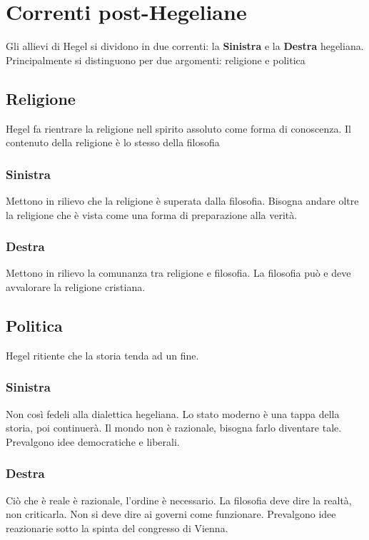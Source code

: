 
\section{Correnti post-Hegeliane}
Gli allievi di Hegel si dividono in due correnti: la \textbf{Sinistra} e la \textbf{Destra} 
hegeliana. Principalmente si distinguono per due argomenti: religione e politica

\subsection{Religione}
Hegel fa rientrare la religione nell spirito assoluto come forma di conoscenza. Il contenuto della
religione è lo stesso della filosofia

\subsubsection{Sinistra}
Mettono in rilievo che la religione è superata dalla filosofia. Bisogna andare oltre la religione che
è vista come una forma di preparazione alla verità.

\subsubsection{Destra}
Mettono in rilievo la comunanza tra religione e filosofia. La filosofia può e deve avvalorare la 
religione cristiana.

\subsection{Politica}
Hegel ritiente che la storia tenda ad un fine.

\subsubsection{Sinistra}
Non così fedeli alla dialettica hegeliana. Lo stato moderno è una tappa della storia, poi continuerà.
Il mondo non è razionale, bisogna farlo diventare tale. Prevalgono idee democratiche e liberali.

\subsubsection{Destra}
Ciò che è reale è razionale, l'ordine è necessario. La filosofia deve dire la realtà, non criticarla.
Non si deve dire ai governi come funzionare. Prevalgono idee reazionarie sotto la spinta del
congresso di Vienna.
